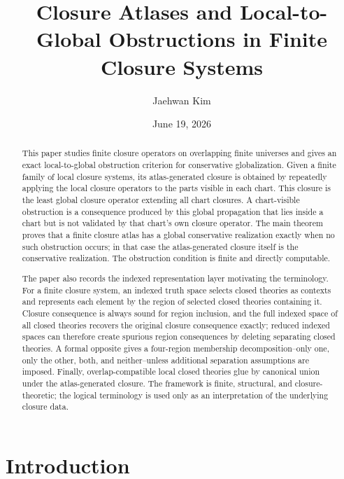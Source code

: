 \documentclass[11pt]{amsart}
\title[Closure atlases and local-to-global obstructions]{Closure Atlases and Local-to-Global Obstructions in Finite Closure Systems}
\author{Jaehwan Kim}
\date{June 19, 2026}
\numberwithin{equation}{section}
\theoremstyle{plain}
\theoremstyle{definition}
\theoremstyle{remark}
\begin{document}
\begin{abstract}
This paper studies finite closure operators on overlapping finite universes and gives an exact local-to-global obstruction criterion for conservative globalization.  Given a finite family of local closure systems, its atlas-generated closure is obtained by repeatedly applying the local closure operators to the parts visible in each chart.  This closure is the least global closure operator extending all chart closures.  A chart-visible obstruction is a consequence produced by this global propagation that lies inside a chart but is not validated by that chart's own closure operator.  The main theorem proves that a finite closure atlas has a global conservative realization exactly when no such obstruction occurs; in that case the atlas-generated closure itself is the conservative realization.  The obstruction condition is finite and directly computable.

The paper also records the indexed representation layer motivating the terminology.  For a finite closure system, an indexed truth space selects closed theories as contexts and represents each element by the region of selected closed theories containing it.  Closure consequence is always sound for region inclusion, and the full indexed space of all closed theories recovers the original closure consequence exactly; reduced indexed spaces can therefore create spurious region consequences by deleting separating closed theories.  A formal opposite gives a four-region membership decomposition--only one, only the other, both, and neither--unless additional separation assumptions are imposed.  Finally, overlap-compatible local closed theories glue by canonical union under the atlas-generated closure.  The framework is finite, structural, and closure-theoretic; the logical terminology is used only as an interpretation of the underlying closure data.
\end{abstract}

\maketitle

\setcounter{tocdepth}{1}
\tableofcontents


\section{Introduction}
\label{sec:introduction}
\end{document}
